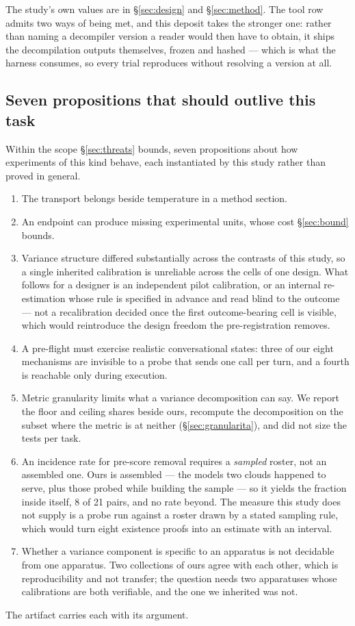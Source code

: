 The study's own values are in \S\ref{sec:design} and \S\ref{sec:method}. The tool row admits two ways of
being met, and this deposit takes the stronger one: rather than naming a decompiler version a reader would
then have to obtain, it ships the decompilation outputs themselves, frozen and hashed --- which is what the
harness consumes, so every trial reproduces without resolving a version at all.

\subsection{Seven propositions that should outlive this task}
\label{sec:proposizioni}

Within the scope \S\ref{sec:threats} bounds, seven propositions about how experiments of this kind behave,
each instantiated by this study rather than proved in general.

\begin{enumerate}
  \item The transport belongs beside temperature in a method section.
  \item An endpoint can produce missing experimental units, whose cost \S\ref{sec:bound} bounds.
  \item Variance structure differed substantially across the contrasts of this study, so a single
        inherited calibration is unreliable across the cells of one design. What follows for a designer is
        an independent pilot calibration, or an internal re-estimation whose rule is specified in advance
        and read blind to the outcome --- not a recalibration decided once the first outcome-bearing cell
        is visible, which would reintroduce the design freedom the pre-registration removes.
  \item A pre-flight must exercise realistic conversational states: three of our eight mechanisms are
        invisible to a probe that sends one call per turn, and a fourth is reachable only during
        execution.
  \item Metric granularity limits what a variance decomposition can say. We report the floor and ceiling
        shares beside ours, recompute the decomposition on the subset where the metric is at neither
        (\S\ref{sec:granularita}), and did not size the tests per task.
  \item An incidence rate for pre-score removal requires a \emph{sampled} roster, not an assembled one.
        Ours is assembled --- the models two clouds happened to serve, plus those probed while building the
        sample --- so it yields the fraction inside itself, 8 of 21 pairs, and no rate beyond. The measure
        this study does not supply is a probe run against a roster drawn by a stated sampling rule, which
        would turn eight existence proofs into an estimate with an interval.
  \item Whether a variance component is specific to an apparatus is not decidable from one apparatus. Two
        collections of ours agree with each other, which is reproducibility and not transfer; the question
        needs two apparatuses whose calibrations are both verifiable, and the one we inherited was not.
\end{enumerate}

\noindent
The artifact carries each with its argument.


